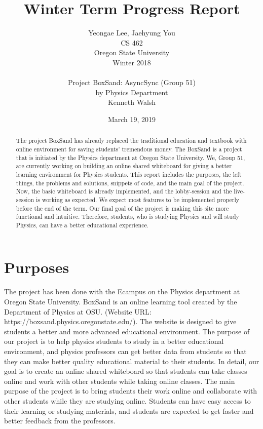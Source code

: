 \documentclass[10pt, letterpaper]{article}
\begin{document}
\begin{titlepage}
    \title{Winter Term Progress Report}
    \author{Yeongae Lee, Jaehyung You \\ CS 462  \\ Oregon State University \\ Winter 2018 \\ \\ Project BoxSand: AsyncSync (Group 51) \\by Physics Department \\ Kenneth Walsh}
    \date {March 19, 2019}

  
    \maketitle
        \begin{abstract}
       The project BoxSand has already replaced the traditional education and textbook with online environment for saving students’ tremendous money. The BoxSand is a project that is initiated by the Physics department at Oregon State University. We, Group 51, are currently working on building an online shared whiteboard for giving a better learning environment for Physics students. This report includes the purposes, the left things, the problems and solutions, snippets of code, and the main goal of the project. Now, the basic whiteboard is already implemented, and the lobby-session and the live-session is working as expected. We expect most features to be implemented properly before the end of the term. Our final goal of the project is making this site more functional and intuitive. Therefore, students, who is studying Physics and will study Physics, can have a better educational experience.
        \end{abstract}     
\end{titlepage}
\newpage

\section{Purposes}
    The project has been done with the Ecampus on the Physics department at Oregon State University. BoxSand is an online learning tool created by the Department of Physics at OSU. (Website URL: https://boxsand.physics.oregonstate.edu/). The website is designed to give students a better and more advanced educational environment. The purpose of our project is to help physics students to study in a better educational environment, and physics professors can get better data from students so that they can make better quality educational material to their students. In detail, our goal is to create an online shared whiteboard so that students can take classes online and work with other students while taking online classes. The main purpose of the project is to bring students their work online and collaborate with other students while they are studying online. Students can have easy access to their learning or studying materials, and students are expected to get faster and better feedback from the professors.
\end{document}
